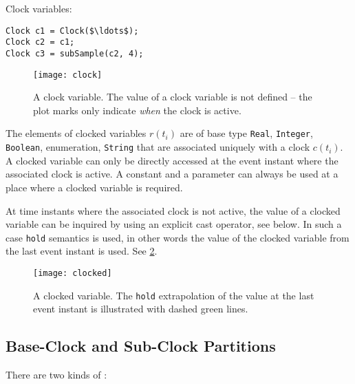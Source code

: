 \begin{example}
Clock variables:
\begin{lstlisting}[language=modelica]
Clock c1 = Clock($\ldots$);
Clock c2 = c1;
Clock c3 = subSample(c2, 4);
\end{lstlisting}
\end{example}

\begin{figure}[H]
  \begin{center}
    \texttt{[image: clock]}
  \end{center}
  \caption{A clock variable.  The value of a clock variable is not defined -- the plot marks only indicate \emph{when} the clock is active.}\label{fig:clock-variable}
\end{figure}

\begin{definition}
The elements of clocked variables $r(t_{i})$ are of base type \lstinline!Real!, \lstinline!Integer!, \lstinline!Boolean!, enumeration, \lstinline!String! that are associated uniquely with
a clock $c(t_{i})$.  A clocked variable can only be directly accessed at the event instant where the associated clock is active.  A constant and a parameter can always be used at a place
where a clocked variable is required.

At time instants where the associated clock is not active, the value of a clocked variable can be inquired by using an explicit cast operator, see below.  In such a case \lstinline!hold! semantics is
used, in other words the value of the clocked variable from the last event instant is used.  See \cref{fig:clocked-variable}.
\end{definition}

\begin{figure}[H]
  \begin{center}
    \texttt{[image: clocked]}
  \end{center}
  \caption{A clocked variable.  The \lstinline!hold! extrapolation of the value at the last event instant is illustrated with dashed green lines.}\label{fig:clocked-variable}
\end{figure}

\subsection{Base-Clock and Sub-Clock Partitions}\label{base-clock-and-sub-clock-partitions}

There are two kinds of :

